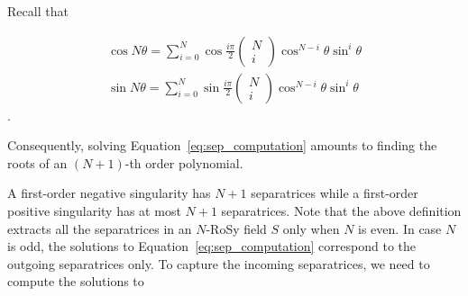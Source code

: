 \documentclass{acmsiggraph}               %
\begin{document}
Recall that

\begin{eqnarray}
\cos N\theta =
\sum_{i=0}^N{\cos\frac{i\pi}{2}
\begin{pmatrix} N \\ i \end{pmatrix} \cos^{N-i}\theta\sin^i\theta} \\ \sin N\theta =
\sum_{i=0}^N{\sin\frac{i\pi}{2} \begin{pmatrix} N \\ i
\end{pmatrix} \cos^{N-i}\theta\sin^i\theta}
\end{eqnarray}.

\noindent Consequently, solving Equation~\ref{eq:sep_computation}
amounts to finding the roots of an $(N+1)$-th order polynomial.
%
%
%
%


%
%
%
%
%
%
A first-order negative singularity has $N+1$ separatrices while a
first-order positive singularity has at most $N+1$ separatrices.
Note that the above definition extracts all the separatrices in an
$N$-RoSy field $S$ only when $N$ is even. In case $N$ is odd, the
solutions to Equation~\ref{eq:sep_computation} correspond to the
outgoing separatrices only. To capture the incoming separatrices, we
need to compute the solutions to
\end{document}
